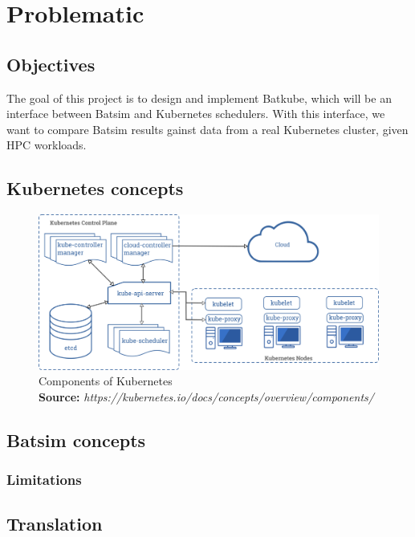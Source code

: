 \documentclass[12pt]{report}
\newcommand*{\captionsource}[2]{%
    \caption[{#1}]{%
        #1%
        \\\hspace{\linewidth}%
	\textbf{Source:} \textit{#2}%
    }%
}
\begin{document}
\chapter{Problematic}

\section{Objectives}

The goal of this project is to design and implement Batkube, which will be an
interface between Batsim and Kubernetes schedulers. With this interface, we
want to compare Batsim results gainst data from a real Kubernetes cluster,
given HPC workloads.

\section{Kubernetes concepts}

\begin{figure}[]
	\centering
	\includegraphics[width=\textwidth]{imgs/components-of-kubernetes.png}
	\captionsource{Components of Kubernetes}{https://kubernetes.io/docs/concepts/overview/components/}
	\label{fig:kube-components}
\end{figure}

\section{Batsim concepts}

\subsection{Limitations}

\section{Translation}
\end{document}
